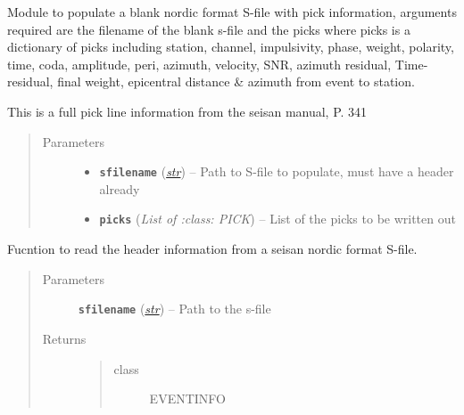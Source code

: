 \documentclass[a4paper,10pt,english]{sphinxmanual}
\begin{document}

\begin{fulllineitems}
\label{submodules/utils.Sfile_util:Sfile_util.populateSfile}
Module to populate a blank nordic format S-file with pick information,
arguments required are the filename of the blank s-file and the picks
where picks is a dictionary of picks including station, channel,
impulsivity, phase, weight, polarity, time, coda, amplitude, peri, azimuth,
velocity, SNR, azimuth residual, Time-residual, final weight,
epicentral distance \& azimuth from event to station.

This is a full pick line information from the seisan manual, P. 341
\begin{quote}\begin{description}
\item[{Parameters}] \leavevmode\begin{itemize}
\item {} 
\textbf{\texttt{sfilename}} (\href{https://docs.python.org/library/functions.html\#str}{\emph{str}}) -- Path to S-file to populate, must have a header already

\item {} 
\textbf{\texttt{picks}} (\emph{List of :class: PICK}) -- List of the picks to be written out

\end{itemize}

\end{description}\end{quote}

\end{fulllineitems}


\begin{fulllineitems}
\label{submodules/utils.Sfile_util:Sfile_util.readheader}
Fucntion to read the header information from a seisan nordic format S-file.
\begin{quote}\begin{description}
\item[{Parameters}] \leavevmode
\textbf{\texttt{sfilename}} (\href{https://docs.python.org/library/functions.html\#str}{\emph{str}}) -- Path to the s-file

\item[{Returns}] \leavevmode
\begin{quote}\begin{description}
\item[{class}] \leavevmode
EVENTINFO

\end{description}\end{quote}


\end{description}\end{quote}

\end{fulllineitems}
\end{document}
